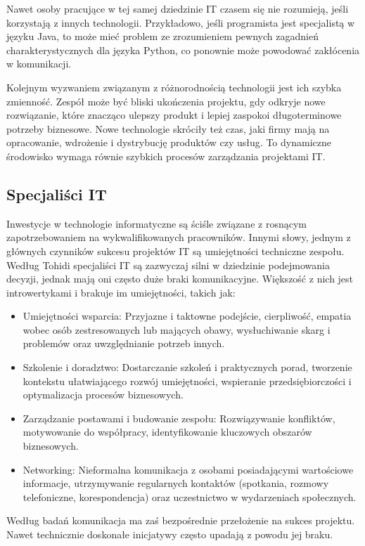 Nawet osoby pracujące w tej samej dziedzinie IT czasem się nie rozumieją, jeśli korzystają z innych technologii. Przykładowo, jeśli programista jest specjalistą w języku Java, to może mieć problem ze zrozumieniem pewnych zagadnień charakterystycznych dla języka Python, co ponownie może powodować zakłócenia w komunikacji.

Kolejnym wyzwaniem związanym z różnorodnością technologii jest ich szybka zmienność. Zespół może być bliski ukończenia projektu, gdy odkryje nowe rozwiązanie, które znacząco ulepszy produkt i lepiej zaspokoi długoterminowe potrzeby biznesowe. Nowe technologie skróciły też czas, jaki firmy mają na opracowanie, wdrożenie i dystrybucję produktów czy usług. To dynamiczne środowisko wymaga równie szybkich procesów zarządzania projektami IT. \autocite{ITPM}

\subsection{Specjaliści IT}
Inwestycje w technologie informatyczne są ściśle związane z rosnącym zapotrzebowaniem na wykwalifikowanych pracowników. Innymi słowy, jednym z głównych czynników sukcesu projektów IT są umiejętności techniczne zespołu. Według Tohidi specjaliści IT są zazwyczaj silni w dziedzinie podejmowania decyzji, jednak mają oni często duże braki komunikacyjne. Większość z nich jest introwertykami i brakuje im umiejętności, takich jak:
\begin{itemize}
    \item Umiejętności wsparcia: Przyjazne i taktowne podejście, cierpliwość, empatia wobec osób zestresowanych lub mających obawy, wysłuchiwanie skarg i problemów oraz uwzględnianie potrzeb innych.
    \item Szkolenie i doradztwo: Dostarczanie szkoleń i praktycznych porad, tworzenie kontekstu ułatwiającego rozwój umiejętności, wspieranie przedsiębiorczości i optymalizacja procesów biznesowych.
    \item Zarządzanie postawami i budowanie zespołu: Rozwiązywanie konfliktów, motywowanie do współpracy, identyfikowanie kluczowych obszarów biznesowych.
    \item Networking: Nieformalna komunikacja z osobami posiadającymi wartościowe informacje, utrzymywanie regularnych kontaktów (spotkania, rozmowy telefoniczne, korespondencja) oraz uczestnictwo w wydarzeniach społecznych.
\end{itemize}

Według badań komunikacja ma zaś bezpośrednie przełożenie na sukces projektu. \autocite{komunikacja} Nawet technicznie doskonałe inicjatywy często upadają z powodu jej braku. \autocite{Tohidi}

